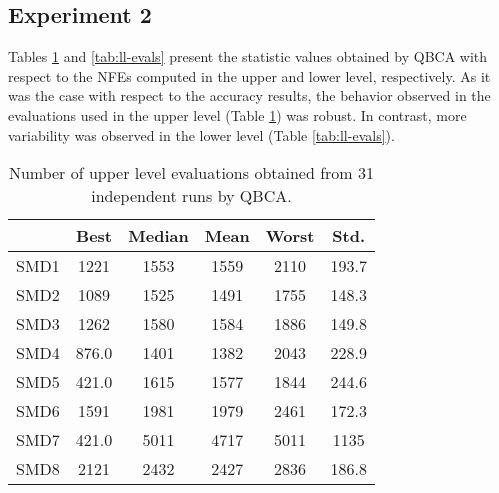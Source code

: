 \documentclass[conference]{IEEEtran}
\theoremstyle{definition}
\begin{document}
\subsection{Experiment 2}
Tables \ref{tab:ul-evals} and \ref{tab:ll-evals} present the statistic values
obtained by QBCA with respect to the NFEs computed in the upper and lower level,
respectively. As it was the case with respect to the accuracy results, the behavior
observed in the evaluations used in the upper level (Table \ref{tab:ul-evals})
was robust. In contrast, more variability was observed in the lower level
(Table \ref{tab:ll-evals}). 

\begin{table}[htbp]
    \caption{Number of upper level evaluations obtained from 31 independent runs by QBCA.}
    \label{tab:ul-evals}
    \centering
    \begin{tabular}{cccccc}
        \hline
        & Best &  Median &  Mean &  Worst &  Std. \\ \hline
        SMD1 & 1221 & 1553 & 1559 & 2110 & 193.7 \\ \hline 
        SMD2 & 1089 & 1525 & 1491 & 1755 & 148.3 \\ \hline 
        SMD3 & 1262 & 1580 & 1584 & 1886 & 149.8 \\ \hline 
        SMD4 & 876.0 & 1401 & 1382 & 2043 & 228.9 \\ \hline 
        SMD5 & 421.0 & 1615 & 1577 & 1844 & 244.6 \\ \hline 
        SMD6 & 1591 & 1981 & 1979 & 2461 & 172.3 \\ \hline 
        SMD7 & 421.0 & 5011 & 4717 & 5011 & 1135 \\ \hline 
        SMD8 & 2121 & 2432 & 2427 & 2836 & 186.8 \\ \hline 
    \end{tabular}
\end{table}
\end{document}

